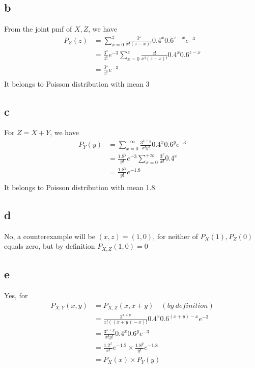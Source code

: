 \documentclass[12pt,letterpaper]{article}
\begin{document}
    \subsection*{b}
        From the joint pmf of $X, Z$, we have
        \begin{equation*}
            \begin{aligned}
                P_{Z}(z) &= \sum_{x = 0}^{z} \frac{3^{z}}{x!(z - x)!} 0.4^{x} 0.6^{z - x} e^{-3} \\
                &= \frac{3^{z}}{z!}e^{-3} \sum_{x = 0}^{z} \frac{z!}{x!(z - x)!} 0.4^{x} 0.6^{z - x} \\
                &= \frac{3^{z}}{z!}e^{-3} \\
            \end{aligned}
        \end{equation*}
        It belongs to Poisson distribution with mean 3
    \subsection*{c}
        For $Z = X + Y$, we have
        \begin{equation*}
            \begin{aligned}
                P_{Y}(y) &= \sum_{x = 0}^{+\infty} \frac{3^{x + y}}{x!y!} 0.4^{x} 0.6^{y} e^{-3} \\
                &= \frac{1.8^{y}}{y!} e^{-3} \sum_{x = 0}^{+\infty} \frac{3^{x}}{x!} 0.4^{x} \\
                &= \frac{1.8^{y}}{y!} e^{-1.8} \\
            \end{aligned}
        \end{equation*}
        It belongs to Poisson distribution with mean 1.8
    \subsection*{d}
        No, a counterexample will be $(x, z) = (1, 0)$, for neither of $P_{X}(1), P_{Z}(0)$ equals zero, but by definition $P_{X, Z}(1, 0) = 0$
    \subsection*{e}
        Yes, for
        \begin{equation*}
            \begin{aligned}
                P_{X, Y}(x, y) &= P_{X, Z}(x, x + y)\quad (by\ definition) \\
                &= \frac{3^{x + y}}{x!((x + y) - x)!} 0.4^{x} 0.6^{(x + y) - x} e^{-3} \\
                &= \frac{3^{x + y}}{x!y!} 0.4^{x} 0.6^{y} e^{-3} \\
                &= \frac{1.2^{x}}{x!}e^{-1.2} \times \frac{1.8^{y}}{y!} e^{-1.8} \\
                &= P_{X}(x) \times P_{Y}(y) \\
            \end{aligned}
        \end{equation*}
\end{document}
